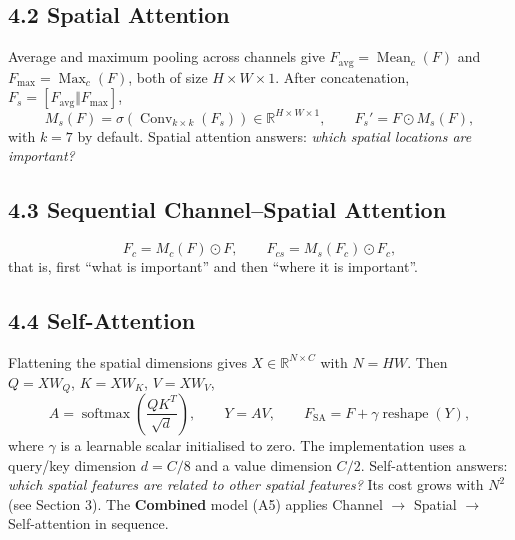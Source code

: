 \documentclass[10pt]{article}
\begin{document}
\subsection*{4.2 Spatial Attention}

Average and maximum pooling across channels give
$F_{\mathrm{avg}}=\operatorname{Mean}_c(F)$ and
$F_{\mathrm{max}}=\operatorname{Max}_c(F)$, both of size $H\times W\times1$.
After concatenation, $F_s=[F_{\mathrm{avg}}\Vert F_{\mathrm{max}}]$,
\[
M_s(F)
=
\sigma
\left(
\operatorname{Conv}_{k\times k}(F_s)
\right)
\in\mathbb{R}^{H\times W\times1},
\qquad
F_s'
=
F\odot M_s(F),
\]
with $k=7$ by default. Spatial attention answers: \emph{which spatial
locations are important?}

\subsection*{4.3 Sequential Channel--Spatial Attention}

\[
F_c=M_c(F)\odot F,
\qquad
F_{cs}=M_s(F_c)\odot F_c,
\]
that is, first ``what is important'' and then ``where it is important''.

\begin{center}


\end{center}

\subsection*{4.4 Self-Attention}

Flattening the spatial dimensions gives $X\in\mathbb{R}^{N\times C}$ with
$N=HW$. Then $Q=XW_Q$, $K=XW_K$, $V=XW_V$,
\[
A
=
\operatorname{softmax}
\left(
\frac{QK^T}{\sqrt{d}}
\right),
\qquad
Y=AV,
\qquad
F_{\mathrm{SA}}
=
F
+
\gamma
\operatorname{reshape}(Y),
\]
where $\gamma$ is a learnable scalar initialised to zero. The implementation
uses a query/key dimension $d=C/8$ and a value dimension $C/2$.
Self-attention answers: \emph{which spatial features are related to other
spatial features?} Its cost grows with $N^2$ (see Section 3).
The \textbf{Combined} model (A5) applies Channel $\rightarrow$ Spatial
$\rightarrow$ Self-attention in sequence.
\end{document}
